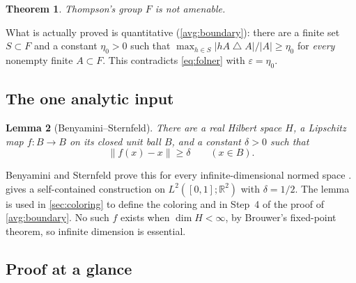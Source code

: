 \documentclass[11pt]{article}
\newcommand{\R}{\mathbb R}
\newcommand{\norm}[1]{\lVert #1\rVert}
\newtheorem{theorem}{Theorem}[section]
\newtheorem{lemma}[theorem]{Lemma}
\theoremstyle{definition}
\numberwithin{equation}{section}
\begin{document}
\begin{theorem}\label{thm:main}
Thompson's group \(F\) is not amenable.
\end{theorem}

What is actually proved is quantitative (\cref{avg:boundary}): there are a
finite set \(S\subset F\) and a constant \(\eta_0>0\) such that
\(\max_{h\in S}|hA\mathbin{\triangle}A|/|A|\ge \eta_0\) for \emph{every}
nonempty finite \(A\subset F\). This contradicts \eqref{eq:folner} with
\(\varepsilon=\eta_0\).

\subsection{The one analytic input}

\begin{lemma}[Benyamini--Sternfeld]\label{lem:displacement}
There are a real Hilbert space \(H\), a Lipschitz map \(f:B\to B\) on its
closed unit ball \(B\), and a constant \(\delta>0\) such that
\[
  \norm{f(x)-x}\ge\delta\qquad(x\in B).
\]
\end{lemma}

Benyamini and Sternfeld prove this for every infinite-dimensional normed
space \cite[Theorem, part~(3), p.~439]{BenyaminiSternfeld1983}.
 gives a self-contained construction on
\(L^2([0,1];\R^2)\) with \(\delta=1/2\). The lemma is used in
\cref{sec:coloring} to define the coloring and in Step~4 of the proof of
\cref{avg:boundary}. No such \(f\) exists when \(\dim H<\infty\), by
Brouwer's fixed-point theorem, so infinite dimension is essential.

\subsection{Proof at a glance}\label{sec:glance}
\end{document}
